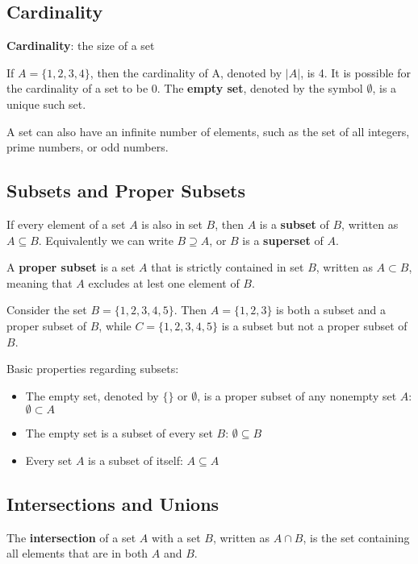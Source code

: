 \documentclass[12pt,a4paper]{article}
\begin{document}
\subsection*{Cardinality}
\textbf{Cardinality}: the size of a set

\bigbreak

If $A=\{1, 2, 3, 4\}$, then the cardinality of A, denoted by $\lvert A \rvert$, is 4. It is possible for the cardinality of a set to be 0. The \textbf{empty set}, denoted by the symbol $\emptyset$, is a unique such set.

\bigbreak

A set can also have an infinite number of elements, such as the set of all integers, prime numbers, or odd numbers.

\subsection*{Subsets and Proper Subsets}
If every element of a set $A$ is also in set $B$, then $A$ is a \textbf{subset} of $B$, written as $A\subseteq B$. Equivalently we can write $B\supseteq A$, or $B$ is a \textbf{superset} of $A$.

\bigbreak

A \textbf{proper subset} is a set $A$ that is strictly contained in set $B$, written as $A\subset B$, meaning that $A$ excludes at lest one element of $B$.

\bigbreak

Consider the set $B=\{1, 2, 3, 4, 5\}$. Then $A=\{1, 2, 3\}$ is both a subset and a proper subset of $B$, while $C=\{1, 2, 3, 4, 5\}$ is a subset but not a proper subset of $B$.

\newpage

Basic properties regarding subsets:
\begin{itemize}
	\item The empty set, denoted by $\{\}$ or $\emptyset$, is a proper subset of any nonempty set $A$: $\emptyset \subset A$
	\item The empty set is a subset of every set $B$: $\emptyset \subseteq B$
	\item Every set $A$ is a subset of itself: $A \subseteq A$
\end{itemize}

\subsection*{Intersections and Unions}
The \textbf{intersection} of a set $A$ with a set $B$, written as $A\cap B$, is the set containing all elements that are in both $A$ and $B$.
\end{document}
